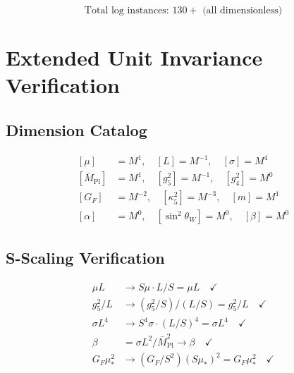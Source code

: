 \documentclass[11pt,a4paper]{article}
\theoremstyle{definition}
\begin{document}
\begin{equation}
\label{eq:log_stress_count}
\text{Total log instances: } 130+ \text{ (all dimensionless)}
\end{equation}

\section{Extended Unit Invariance Verification}
\label{app:unit_inv}

\subsection{Dimension Catalog}
\label{subsec:dim_catalog}

\begin{align}
\label{eq:dim_cat_1}
[\mu] &= M^1, \quad [L] = M^{-1}, \quad [\sigma] = M^4 \\
\label{eq:dim_cat_2}
[\bar{M}_{\text{Pl}}] &= M^1, \quad [g_5^2] = M^{-1}, \quad [g_4^2] = M^0 \\
\label{eq:dim_cat_3}
[G_F] &= M^{-2}, \quad [\kappa_5^2] = M^{-3}, \quad [m] = M^1 \\
\label{eq:dim_cat_4}
[\alpha] &= M^0, \quad [\sin^2\theta_W] = M^0, \quad [\beta] = M^0
\end{align}

\subsection{S-Scaling Verification}
\label{subsec:S_scaling}

\begin{align}
\label{eq:S_ver_1}
\mu L &\to S\mu \cdot L/S = \mu L \quad \checkmark \\
\label{eq:S_ver_2}
g_5^2/L &\to (g_5^2/S)/(L/S) = g_5^2/L \quad \checkmark \\
\label{eq:S_ver_3}
\sigma L^4 &\to S^4\sigma \cdot (L/S)^4 = \sigma L^4 \quad \checkmark \\
\label{eq:S_ver_4}
\beta &= \sigma L^2/\bar{M}_{\text{Pl}}^2 \to \beta \quad \checkmark \\
\label{eq:S_ver_5}
G_F\mu_*^2 &\to (G_F/S^2)(S\mu_*)^2 = G_F\mu_*^2 \quad \checkmark
\end{align}
\end{document}
